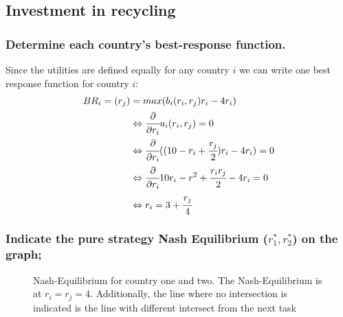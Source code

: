 \subsection{Investment in recycling}

    \subsubsection{Determine each country's best-response function.}
    Since the utilities are defined equally for any country $i$ we can write one best response function for country $i$:
    \begin{equation}
        \begin{split}
            BR_i=(r_j)&=max(b_i(r_i,r_j)r_i-4r_i)\\
            &\Leftrightarrow \cfrac{\partial}{\partial r_i}u_i(r_i,r_j)=0\\
            &\Leftrightarrow \cfrac{\partial}{\partial r_i}((10-r_i+\cfrac{r_j}{2})r_i-4r_i)=0\\
            &\Leftrightarrow \cfrac{\partial}{\partial r_i}10r_i-r^2+\cfrac{r_ir_j}{2}-4r_i=0\\
            &\Leftrightarrow r_i = 3+\cfrac{r_j}{4}
        \end{split}
    \end{equation}

    \subsubsection{Indicate the pure strategy Nash Equilibrium ($r_1^*,r_2^*$) on the graph;}
    \begin{figure}[H]
        \centering
        \caption{Nash-Equilibrium for country one and two. The Nash-Equilibrium is at $r_i=r_j=4$. Additionally, the line where no
        intersection is indicated is the line with different intersect from the next task}
    \end{figure}

